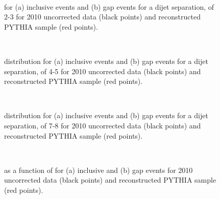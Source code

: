 \begin{figure}
\centering
\mbox{
              \quad
              \quad
                              }
\caption[Comparison of the data and PYTHIA for \dphiDist{} with $2<\dy{}<3$]{
\dphiDist{} for (a) inclusive events and (b) gap events for a dijet separation, \dy{} of 2-3 for 2010 uncorrected data (black points) and reconstructed PYTHIA sample (red points).
\label{GBJ2:Uncorr:dphi23}}
\end{figure}


\begin{figure}
\centering
\mbox{
              \quad
              \quad
                              }
\caption[Comparison of the data and PYTHIA for \dphiDist{} with $4<\dy{}<5$]{
\dphi{} distribution for (a) inclusive events and (b) gap events for a dijet separation, \dy{} of 4-5 for 2010 uncorrected data (black points) and reconstructed PYTHIA sample (red points).
\label{GBJ2:Uncorr:dphi45}}
\end{figure}



\begin{figure}
\centering
\mbox{
              \quad
              \quad
                              }
\caption[Comparison of the data and PYTHIA for \dphiDist{} with $7<\dy{}<8$]{
\dphi{} distribution for (a) inclusive events and (b) gap events for a dijet separation, \dy{} of 7-8 for 2010 uncorrected data (black points) and reconstructed PYTHIA sample (red points).
\label{GBJ2:Uncorr:dphi78}}
\end{figure}



\begin{figure}
\centering
\mbox{
              \quad
              \quad
                              }
\caption[Comparison of the data and PYTHIA for \cosdphi{}]{
\mean{\cosdphi{}} as a function of \dy{} for (a) inclusive and (b) gap events for 2010 uncorrected data (black points) and reconstructed PYTHIA sample (red points).
\label{GBJ2:Uncorr:cos}}
\end{figure}


